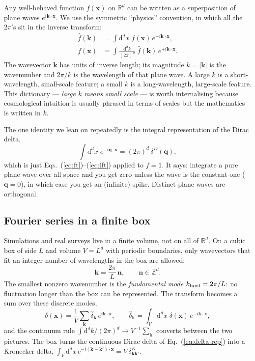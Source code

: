 \documentclass[12pt]{article}
\newcommand{\bk}{\mathbf{k}}
\newcommand{\bx}{\mathbf{x}}
\newcommand{\bn}{\mathbf{n}}
\newcommand{\bq}{\mathbf{q}}
\begin{document}
Any well-behaved function $f(\bx)$ on $\mathbb R^d$ can be written as a
superposition of plane waves $e^{i\bk\cdot\bx}$.  We use the symmetric
``physics'' convention, in which all the $2\pi$'s sit in the inverse
transform:
\begin{align}
  \hat f(\bk) &= \int \mathrm d^d x\; f(\bx)\,e^{-i\bk\cdot\bx},
  \label{eq:ft}\\
  f(\bx) &= \int \frac{\mathrm d^d k}{(2\pi)^d}\; \hat f(\bk)\,e^{+i\bk\cdot\bx}.
  \label{eq:ift}
\end{align}
The wavevector $\bk$ has units of inverse length; its magnitude $k =
|\bk|$ is the wavenumber and $2\pi/k$ is the wavelength of that plane
wave.  A large $k$ is a short-wavelength, small-scale feature; a small
$k$ is a long-wavelength, large-scale feature.  This dictionary ---
\emph{large $k$ means small scale} --- is worth internalising because
cosmological intuition is usually phrased in terms of scales but the
mathematics is written in $k$.

The one identity we lean on repeatedly is the integral representation of
the Dirac delta,
\begin{equation}
  \int \mathrm d^d x\; e^{-i\bq\cdot\bx} = (2\pi)^d\,\delta^D(\bq),
  \label{eq:delta-rep}
\end{equation}
which is just Eqs.~(\ref{eq:ft})--(\ref{eq:ift}) applied to $f = 1$.  It
says: integrate a pure plane wave over all space and you get zero unless
the wave is the constant one ($\bq = 0$), in which case you get an
(infinite) spike.  Distinct plane waves are orthogonal.

\subsection{Fourier series in a finite box}
\label{sec:fseries}

Simulations and real surveys live in a finite volume, not on all of
$\mathbb R^d$.  On a cubic box of side $L$ and volume $V = L^d$ with
periodic boundaries, only wavevectors that fit an integer number of
wavelengths in the box are allowed:
\begin{equation}
  \bk = \frac{2\pi}{L}\,\bn, \qquad \bn \in \mathbb Z^d .
\end{equation}
The smallest nonzero wavenumber is the \emph{fundamental mode}
$k_{\rm fund} = 2\pi/L$: no fluctuation longer than the box can be
represented.  The transform becomes a sum over these discrete modes,
\begin{equation}
  \delta(\bx) = \frac{1}{V}\sum_{\bk} \hat\delta_{\bk}\,e^{i\bk\cdot\bx},
  \qquad
  \hat\delta_{\bk} = \int_V \mathrm d^d x\; \delta(\bx)\,e^{-i\bk\cdot\bx},
  \label{eq:fseries}
\end{equation}
and the continuum rule $\int \mathrm d^d k/(2\pi)^d \to V^{-1}\sum_\bk$
converts between the two pictures.  The box turns the continuous Dirac
delta of Eq.~(\ref{eq:delta-rep}) into a Kronecker delta,
$\int_V \mathrm d^d x\, e^{-i(\bk-\bk')\cdot\bx} = V\,\delta^K_{\bk\bk'}$.
\end{document}
